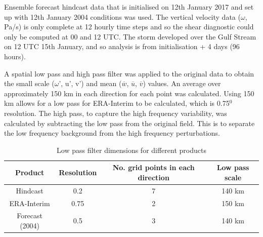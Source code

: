 Ensemble forecast hindcast data that is initialised on 12th January 2017 and set up with 12th January 2004 conditions was used. The vertical velocity data ($\omega$, Pa/s) is only complete at 12 hourly time steps and so the shear diagnostic could only be computed at 00 and 12 UTC. The storm developed over the Gulf Stream on 12 UTC 15th January, and so analysis is from initialisation + 4 days (96 hours).
%
%



A spatial low pass and high pass filter was applied to the original data to obtain the small scale (${\omega}$', u', v') and mean ($\overline{w}$, $\overline{u}$, $\overline{v}$) values. An average over approximately 150 km in each direction for each point was calculated. Using 150 km allows for a low pass for ERA-Interim to be calculated, which is 0.75$^0$ resolution. The high pass, to capture the high frequency variability, was calculated by subtracting the low pass from the original field. This is to separate the low frequency background from the high frequency perturbations.

\begin{table}
	\caption{Low pass filter dimensions for different products}\label{t_lowpass}
	\begin{center}
		\begin{tabular}{cccc}
			\hline\hline
			Product & Resolution & No. grid points in each direction & Low pass scale \\
			\hline
			Hindcast & 0.2 & 7 & 140 km \\ 
			ERA-Interim & 0.75  & 2 & 150 km \\
			Forecast (2004) & 0.5 &  3 & 140 km \\ %
			
			\hline
		\end{tabular}
	\end{center}
\end{table}


